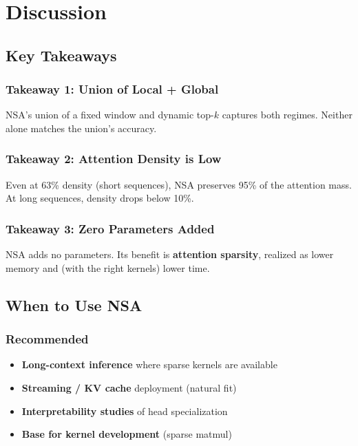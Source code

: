 
\section{Discussion}

\subsection{Key Takeaways}

\subsubsection{Takeaway 1: Union of Local + Global}

NSA's union of a fixed window and dynamic top-$k$ captures both regimes. 
Neither alone matches the union's accuracy.

\subsubsection{Takeaway 2: Attention Density is Low}

Even at 63\% density (short sequences), NSA preserves 95\% of the attention 
mass. At long sequences, density drops below 10\%.

\subsubsection{Takeaway 3: Zero Parameters Added}

NSA adds no parameters. Its benefit is \textbf{attention sparsity}, realized as 
lower memory and (with the right kernels) lower time.

\subsection{When to Use NSA}

\subsubsection{Recommended}

\begin{itemize}
\item \textbf{Long-context inference} where sparse kernels are available
\item \textbf{Streaming / KV cache} deployment (natural fit)
\item \textbf{Interpretability studies} of head specialization
\item \textbf{Base for kernel development} (sparse matmul)

\end{itemize}
